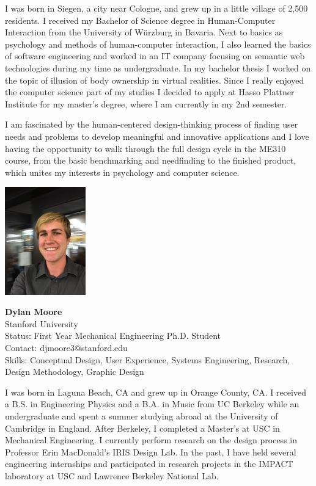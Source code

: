 I was born in Siegen, a city near Cologne, and grew up in a little village of 2,500 residents. I received my Bachelor of Science degree in Human-Computer Interaction from the University of Würzburg in Bavaria. Next to basics as psychology and methods of human-computer interaction, I also learned the basics of software engineering and worked in an IT company focusing on semantic web technologies during my time as undergraduate. In my bachelor thesis I worked on the topic of illusion of body ownership in virtual realities. Since I really enjoyed the computer science part of my studies I decided to apply at Hasso Plattner Institute for my master's degree, where I am currently in my 2nd semester.

I am fascinated by the human-centered design-thinking process of finding user needs and problems to develop meaningful and innovative applications and I love having the opportunity to walk through the full design cycle in the ME310 course, from the basic benchmarking and needfinding to the finished product, which unites my interests in psychology and computer science.

\vspace{2em}
\noindent \includegraphics[width=35mm]{Figures/People/Dylan}
\hspace{0.5em}\parbox[b]{0.6\textwidth}{\textbf{Dylan Moore}\\
Stanford University\\
Status: First Year Mechanical Engineering Ph.D. Student\\
Contact: djmoore3@stanford.edu\\
Skills: Conceptual Design, User Experience, Systems Engineering, Research, Design Methodology, Graphic Design\\
}

I was born in Laguna Beach, CA and grew up in Orange County, CA. I received a B.S. in Engineering Physics and a B.A. in Music from UC Berkeley while an undergraduate and spent a summer studying abroad at the University of Cambridge in England. After Berkeley, I completed a Master’s at USC in Mechanical Engineering. I currently perform research on the design process in Professor Erin MacDonald's IRIS Design Lab. In the past, I have held several engineering internships and participated in research projects in the IMPACT laboratory at USC and Lawrence Berkeley National Lab.

